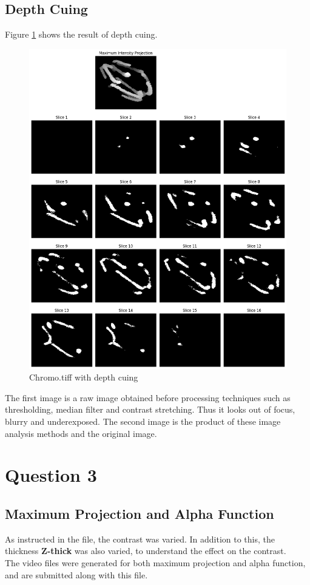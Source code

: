 \documentclass{article}
\begin{document}
\subsection*{Depth Cuing}
Figure \ref{fig:depthcuing} shows the result of depth cuing. 
\begin{figure}
    \centering
    \includegraphics[width=1\linewidth]{Report/Images/mip.png}
    \caption{Chromo.tiff with depth cuing}
    \label{fig:depthcuing}
\end{figure}

The first image is a raw image obtained before processing techniques such as thresholding, median filter and contrast stretching. Thus it looks out of focus, blurry and underexposed. The second image is the product of these image analysis methods and the original image. 




\section*{Question 3}
\subsection*{Maximum Projection and Alpha Function}
As instructed in the file, the contrast was varied. In addition to this, the thickness \textbf{Z-thick} was also varied, to understand the effect on the contrast. \\The video files were generated for both maximum projection and alpha function, and are submitted along with this file. 
\end{document}
